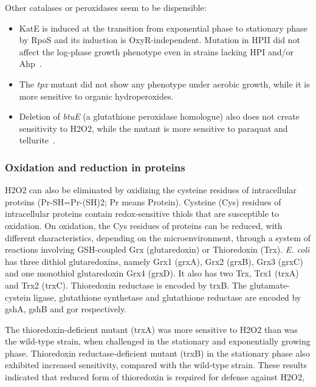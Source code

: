 \documentclass[10pt]{article}
\begin{document}
Other catalases or peroxidases seem to be dispensible:
\begin{itemize}
\item{KatE is induced at the transition from exponential phase to stationary phase by RpoS and its induction is OxyR-independent. Mutation in HPII did not affect the log-phase growth phenotype even in strains lacking HPI and/or Ahp~\cite{seaver2001alkyl}.}

\item{The \textit{tpx} mutant did not show any phenotype under aerobic growth, while it is more sensitive to organic hydroperoxides.}

\item{Deletion of \textit{btuE} (a glutathione peroxidase homologue) also does not create sensitivity to H2O2, while the mutant is more sensitive to paraquat and tellurite~\cite{arenas2011escherichia}.}

\end{itemize}

\subsubsection{Oxidation and reduction in proteins}

H2O2 can also be eliminated by oxidizing the cysteine residues of intracellular proteins (Pr-SH=Pr-(SH)2; Pr means Protein). Cysteine (Cys) residues of intracellular proteins contain redox-sensitive thiols that are susceptible to oxidation. On oxidation, the Cys residues of proteins can be reduced, with different characteristics, depending on the microenvironment, through a system of reactions involving GSH-coupled Grx (glutaredoxin) or Thioredoxin (Trx). \textit{E. coli} has three dithiol glutaredoxins, namely Grx1 (grxA), Grx2 (grxB), Grx3 (grxC) and one monothiol glutaredoxin Grx4 (grxD). It also has two Trx, Trx1 (trxA) and Trx2 (trxC). Thioredoxin reductase is encoded by trxB. The glutamate-cystein ligase, glutathione synthetase and glutathione reductase are encoded by gshA, gshB and gor respectively.

The thioredoxin-deficient mutant (trxA) was more sensitive to H2O2 than was the wild-type strain, when challenged in the stationary and exponentially growing phase. Thioredoxin reductase-deficient mutant (trxB) in the stationary phase also exhibited increased sensitivity, compared with the wild-type strain. These results indicated that reduced form of thioredoxin is required for defense against H2O2,
\end{document}
